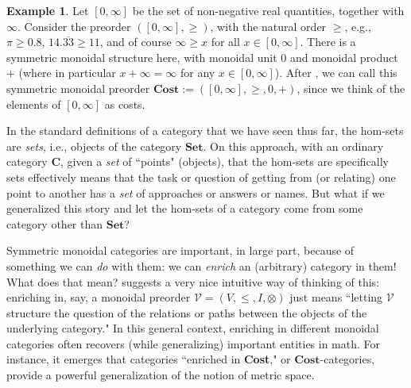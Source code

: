 \documentclass[11pt]{book}
\theoremstyle{definition}
\newtheorem{example}{Example}[section]
\theoremstyle{definition}
\theoremstyle{definition}
\theoremstyle{theorem}
\theoremstyle{definition}
\begin{document}
\begin{example}
	Let $[0,\infty]$ be the set of non-negative real quantities, together with $\infty$. Consider the preorder $([0, \infty], \geq)$, with the natural order $\geq$, e.g., $\pi \geq 0.8$, $14.\overline{33} \geq 11$, and of course $\infty \geq x$ for all $x \in [0, \infty]$. There is a symmetric monoidal structure here, with monoidal unit $0$ and monoidal product $+$ (where in particular $x + \infty = \infty$ for any $x \in [0, \infty]$). After \cite{fong_seven_2018}, we can call this symmetric monoidal preorder $\textbf{Cost} := ([0,\infty], \geq, 0, +)$, since we think of the elements of $[0, \infty]$ as costs. 
\end{example} 
In the standard definitions of a category that we have seen thus far, the hom-sets are \textit{sets}, i.e., objects of the category $\textbf{Set}$. On this approach, with an ordinary category $\textbf{C}$, given a \textit{set} of ``points" (objects), that the hom-sets are specifically sets effectively means that the task or question of getting from (or relating) one point to another has a \textit{set} of approaches or answers or names. But what if we generalized this story and let the hom-sets of a category come from some category other than $\textbf{Set}$?  \par  
Symmetric monoidal categories are important, in large part, because of something we can \textit{do} with them: we can \textit{enrich} an (arbitrary) category in them! What does that mean? \cite{fong_seven_2018} suggests a very nice intuitive way of thinking of this: enriching in, say, a monoidal preorder $\mathcal{V} = (V, \leq, I, \otimes)$ just means ``letting $\mathcal{V}$ structure the question of the relations or paths between the objects of the underlying category." In this general context, enriching in different monoidal categories often recovers (while generalizing) important entities in math. For instance, it emerges that categories ``enriched in \textbf{Cost}," or  $\textbf{Cost}$-categories, provide a powerful generalization of the notion of metric space.
\end{document}
